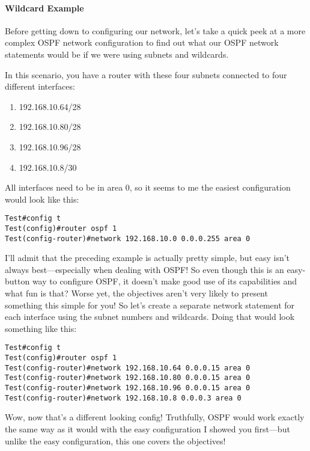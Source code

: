 \paragraph{Wildcard Example}

Before getting down to configuring our network, let's take a quick peek
at a more complex OSPF network configuration to find out what our OSPF
network statements would be if we were using subnets and wildcards.

In this scenario, you have a router with these four subnets connected to
four different interfaces:

\begin{enumerate}
\tightlist
\item
  192.168.10.64/28
\item
  192.168.10.80/28
\item
  192.168.10.96/28
\item
  192.168.10.8/30
\end{enumerate}

All interfaces need to be in area 0, so it seems to me the easiest
configuration would look like this:

\begin{verbatim}
Test#config t
Test(config)#router ospf 1
Test(config-router)#network 192.168.10.0 0.0.0.255 area 0
\end{verbatim}

I'll admit that the preceding example is actually pretty simple, but
easy isn't always best---especially when dealing with OSPF! So even
though this is an easy-button way to configure OSPF, it doesn't make
good use of its capabilities and what fun is that? Worse
\protect\hypertarget{c18.xhtmlux5cux23Page_756}{}{}yet, the objectives
aren't very likely to present something this simple for you! So let's
create a separate network statement for each interface using the subnet
numbers and wildcards. Doing that would look something like this:

\begin{verbatim}
Test#config t
Test(config)#router ospf 1
Test(config-router)#network 192.168.10.64 0.0.0.15 area 0
Test(config-router)#network 192.168.10.80 0.0.0.15 area 0
Test(config-router)#network 192.168.10.96 0.0.0.15 area 0
Test(config-router)#network 192.168.10.8 0.0.0.3 area 0
\end{verbatim}

Wow, now that's a different looking config! Truthfully, OSPF would work
exactly the same way as it would with the easy configuration I showed
you first---but unlike the easy configuration, this one covers the
objectives!


